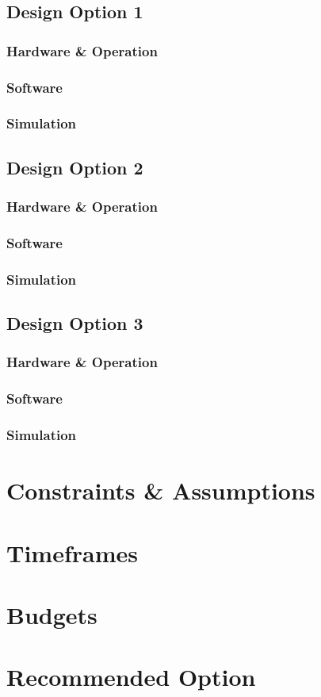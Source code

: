 \documentclass[a4paper]{article}
\begin{document}
\subsection{Design Option 1}
\subsubsection{Hardware \& Operation}
\subsubsection{Software}
\subsubsection{Simulation}

\subsection{Design Option 2}
\subsubsection{Hardware \& Operation}
\subsubsection{Software}
\subsubsection{Simulation}

\subsection{Design Option 3}
\subsubsection{Hardware \& Operation}
\subsubsection{Software}
\subsubsection{Simulation}

\section{Constraints \& Assumptions}

\section{Timeframes}

\section{Budgets}

\section{Recommended Option}
\end{document}
